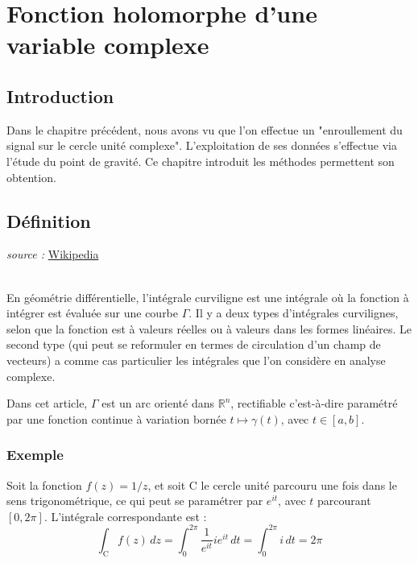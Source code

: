 \documentclass[a4paper]{book}
\begin{document}
\chapter{Fonction holomorphe d'une variable complexe}
\section{Introduction}
Dans le chapitre précédent, nous avons vu que l'on effectue un
"enroullement du signal sur le cercle unité complexe". L'exploitation de ses
données s'effectue via l'étude du point de gravité. Ce chapitre introduit les
méthodes permettent son obtention.

\section{Définition}
\emph{source :} 
\href{https://fr.wikipedia.org/wiki/Int%C3%A9grale_curviligne}{Wikipedia}

\\

En géométrie différentielle, l'intégrale curviligne est une intégrale où la
fonction à intégrer est évaluée sur une courbe $\Gamma$. Il y a deux types d'intégrales
curvilignes, selon que la fonction est à valeurs réelles ou à valeurs dans les
formes linéaires. Le second type (qui peut se reformuler en termes de
circulation d'un champ de vecteurs) a comme cas particulier les intégrales que
l'on considère en analyse complexe.

Dans cet article, $\Gamma$ est un arc orienté dans $\mathbb{R}^n$, rectifiable c'est-à-dire
paramétré par une fonction continue à variation bornée $t \mapsto \gamma(t)$,
avec $t \in [a,b]$. 

\subsection{Exemple}
Soit la fonction $f(z) = 1/z$, et soit $\mathrm{C}$ le cercle unité parcouru une fois dans le
sens trigonométrique, ce qui peut se paramétrer par $e^{it}$, avec $t$
parcourant $[0,2\pi]$. L'intégrale correspondante est :
\begin{equation}
	\int_{\mathrm{C}} f(z) \, dz = \int_{0}^{2\pi} \frac{1}{e^{it}} i e^{it}
	\, dt = \int_{0}^{2\pi} i \, dt = 2\pi
\end{equation}
\end{document}
